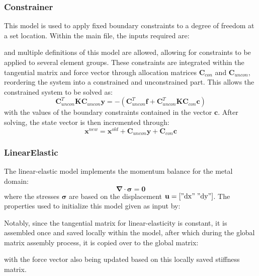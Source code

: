 \documentclass[3p]{elsarticle} %
\begin{document}
\subsubsection{Constrainer}
This model is used to apply fixed boundary constraints to a degree of freedom at a set location. Within the main file, the inputs required are:

and multiple definitions of this model are allowed, allowing for constraints to be applied to several element groups. These constraints are integrated within the tangential matrix and force vector through  allocation matrices $\bm{C}_{con}$ and $\bm{C}_{uncon}$, reordering the system into a constrained and unconstrained part. This allows the constrained system to be solved as:
\begin{equation}
	\bm{C}_{uncon}^T \bm{K} \bm{C}_{uncon} \mathbf{y} = -\left(\bm{C}_{uncon}^T\bm{f}+\bm{C}_{uncon}^T \bm{K} \bm{C}_{con}\mathbf{c}\right)
\end{equation}
with the values of the boundary constraints contained in the vector $\mathbf{c}$. After solving, the state vector is then incremented through:
\begin{equation}
	\mathbf{x}^{new} = \mathbf{x}^{old} + \bm{C}_{uncon}\mathbf{y} + \bm{C}_{con}\mathbf{c}
\end{equation}

\subsubsection{LinearElastic}
The linear-elastic model implements the momentum balance for the metal domain:
\begin{equation}
	\bm{\nabla}\cdot\bm{\sigma} = \mathbf{0}
\end{equation}
where the stresses $\bm{\sigma}$ are based on the displacement $\mathbf{u}=["\mathrm{dx}"\;"\mathrm{dy}"]$. The properties used to initialize this model given as input by:

Notably, since the tangential matrix for linear-elasticity is constant, it is assembled once and saved locally within the model, after which during the global matrix assembly process, it is copied over to the global matrix:

with the force vector also being updated based on this locally saved stiffness matrix. 
\end{document}
